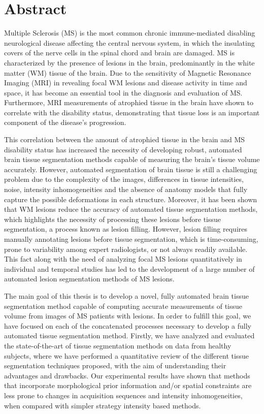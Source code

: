 \chapter*{Abstract}


Multiple Sclerosis (MS)  is the most common chronic immune-mediated disabling neurological disease affecting the central nervous system, in which the insulating covers of the nerve cells in the spinal chord and brain are damaged. MS is characterized by the presence of lesions in the brain, predominantly in the white matter (WM) tissue of the brain. Due to the sensitivity of Magnetic Resonance Imaging (MRI) in revealing focal WM lesions and disease activity in time and space, it has become an essential tool in the diagnosis and evaluation of MS. Furthermore, MRI measurements of atrophied tissue in the brain have shown to correlate with the disability status, demonstrating that tissue loss is an important component of the disease's progression. 

This correlation between the amount of atrophied tissue in the brain and MS disability status has increased the necessity of developing robust, automated brain tissue segmentation methods capable of measuring the brain's tissue volume accurately. However, automated segmentation of brain tissue is still a challenging problem due to the complexity of the images, differences in tissue intensities, noise, intensity inhomogeneities and the absence of anatomy models that fully capture the possible deformations in each structure. Moreover, it has been shown that WM lesions reduce the accuracy of automated tissue segmentation methods, which highlights the necessity of processing these lesions before tissue segmentation, a process known as lesion filling. However, lesion filling requires manually annotating lesions before tissue segmentation, which is time-consuming, prone to variability among expert radiologists, or not always readily available. This fact along with the need of analyzing focal MS lesions quantitatively in individual and temporal studies has led to the development of a large number of automated lesion segmentation methods of MS lesions. 

The main goal of this thesis is to develop a novel, fully automated brain tissue segmentation method capable of computing accurate measurements of tissue volume from images of MS patients with lesions. In order to fulfill this goal, we have focused on each of the concatenated processes necessary to develop a fully automated tissue segmentation method. Firstly, we have analyzed and evaluated the state-of-the-art of tissue segmentation methods on data from healthy subjects, where we have performed a quantitative review of the different  tissue segmentation techniques proposed, with the aim of understanding their advantages and drawbacks. Our experimental results have shown that methods that incorporate morphological prior information and/or spatial constraints are less prone to changes in acquisition sequences and intensity inhomogeneities, when compared with simpler strategy intensity based methods.   

